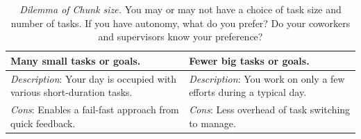 
\begin{center}
\begin{table}[H] %
\begin{tabular}{ | m{\dilemmatablewidth}| m{\dilemmatablewidth} | } 
  \hline
  \textbf{Many small tasks or goals.} & 
  \textbf{Fewer big tasks or goals.} \\ 
  \hline
  \textit{Description}: Your day is occupied with various short-duration tasks. & 
  \textit{Description}: You work on only a few efforts during a typical day. \\  
    \hline
  \textit{Cons}: Enables a fail-fast approach from quick feedback. & 
  \textit{Cons}: Less overhead of task switching to manage. \\
  \hline
\end{tabular}
\caption{
\textit{Dilemma of Chunk size.}
You may or may not have a choice of task size and number of tasks. If you have autonomy, what do you prefer? Do your coworkers and supervisors know your preference? 
}
\label{table:dilemma-chunk-size}
\end{table}
\end{center}



